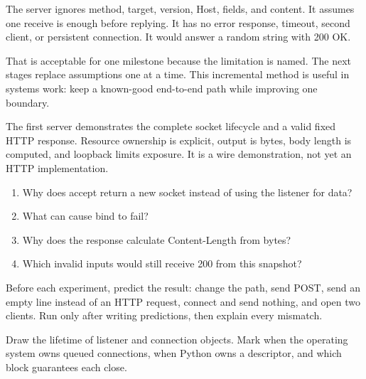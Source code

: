 The server ignores method, target, version, Host, fields, and content. It assumes
one receive is enough before replying. It has no error response, timeout, second
client, or persistent connection. It would answer a random string with 200 OK.

That is acceptable for one milestone because the limitation is named. The next
stages replace assumptions one at a time. This incremental method is useful in
systems work: keep a known-good end-to-end path while improving one boundary.

\summarytitle

The first server demonstrates the complete socket lifecycle and a valid fixed
HTTP response. Resource ownership is explicit, output is bytes, body length is
computed, and loopback limits exposure. It is a wire demonstration, not yet an
HTTP implementation.

\reviewtitle
\begin{enumerate}
  \item Why does accept return a new socket instead of using the listener for data?
  \item What can cause bind to fail?
  \item Why does the response calculate Content-Length from bytes?
  \item Which invalid inputs would still receive 200 from this snapshot?
\end{enumerate}

\begin{exercise}
Before each experiment, predict the result: change the path, send POST, send an
empty line instead of an HTTP request, connect and send nothing, and open two
clients. Run only after writing predictions, then explain every mismatch.
\end{exercise}

\begin{exercise}
Draw the lifetime of listener and connection objects. Mark when the operating
system owns queued connections, when Python owns a descriptor, and which
 block guarantees each close.
\end{exercise}

